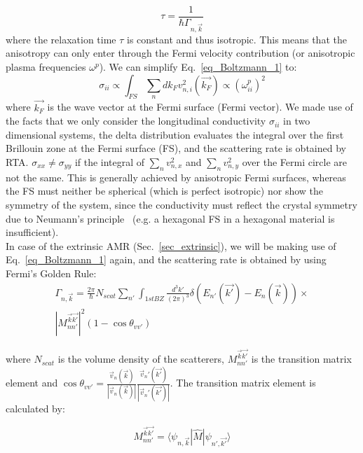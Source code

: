 \documentclass[prb,showpacs,amsmath,amssymb,superscriptaddress,twocolumn,floatfix]{revtex4-1}
\begin{document}
\begin{equation}
	\tau = \frac{1}{\hbar \Gamma_{n, \vec{k}}}
\end{equation}
where the relaxation time $\tau$ is constant and thus isotropic. This means that the anisotropy can only enter through the Fermi velocity contribution (or anisotropic plasma frequencies $\omega^p$). 
We can simplify Eq.~\ref{eq_Boltzmann_1} to:
%
\begin{equation}
	\sigma_{ii} \propto \int_ {FS} \sum_n   dk_F  v^2_{n,i}(\vec{k_F})
	\propto (\omega_{ii}^p)^2
	\label{eq_Boltzmann_2}
\end{equation}
%
where $\vec{k_F}$ is the wave vector at the Fermi surface (Fermi
vector).
We made use of the facts that we only consider the
longitudinal conductivity $\sigma_{ii}$ in two dimensional systems,
the delta distribution evaluates the integral over the first Brillouin
zone at the Fermi surface (FS), and the scattering rate is obtained by
RTA. $\sigma_{xx} \neq \sigma_{yy}$ if the integral of $\sum_n
v^2_{n,x}$ and $\sum_n v^2_{n,y}$ over the Fermi circle are not the
same. This is generally achieved by anisotropic Fermi surfaces,
whereas the FS must neither be spherical (which is perfect isotropic)
nor show the symmetry of the system, since the conductivity must
reflect the crystal symmetry due to Neumann's
principle~\cite{Ritzinger:2021} (e.g. a hexagonal FS in a hexagonal
material is insufficient). \\


In case of the extrinsic AMR (Sec.~\ref{sec_extrinsic}), we will be making use of Eq.~\ref{eq_Boltzmann_1} again, and the scattering rate is obtained by using Fermi's Golden Rule:
%
\begin{multline}
	\Gamma_{n, \vec{k}} = \frac{2 \pi}{\hbar} N_{scat} \sum_{n'}  \int_ {1st BZ} \frac{d^3k'}{(2\pi)^3} \delta(E_{n'}(\vec{k'}) - E_n(\vec{k})) \times \\ |M^{\vec{k}\vec{k'}}_{nn'} |^2 (1 - \cos \theta_{vv'})
	\label{eq_FermiGoldenRule_1}
\end{multline}

where $N_{scat}$ is the volume density of the scatterers, $M^{\vec{k}\vec{k'}}_{nn'}$ is the transition matrix element and $\cos \theta_{vv'} = \frac{\vec{v}_n (\vec{k})}{|\vec{v}_n (\vec{k})|}\frac{\vec{v}_n' (\vec{k'})}{|\vec{v}_n' (\vec{k'})|}$. The transition matrix element is calculated by:

\begin{equation}
	M^{\vec{k}\vec{k'}}_{nn'} = \langle \psi_{n, \vec{k}}|\hat{M}|\psi_{n', \vec{k'}} \rangle
	\label{eq_transmatrix}
\end{equation}
\end{document}
